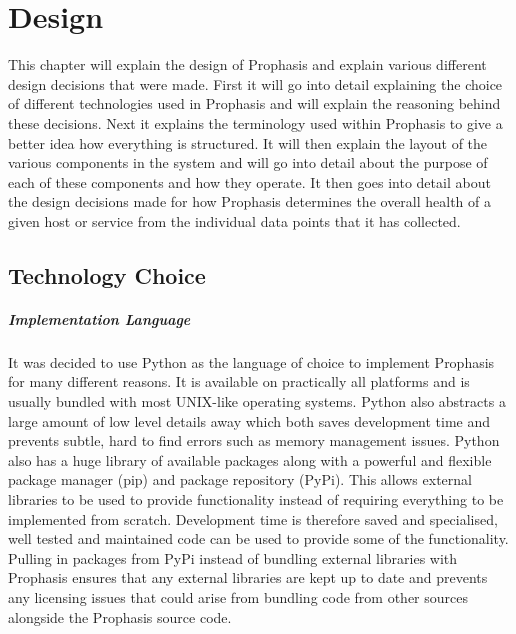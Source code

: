 \documentclass[bsc,deptreport,twoside,parskip,singlespacing,notimes]{infthesis}
\begin{document}

\chapter{Design}
	This chapter will explain the design of Prophasis and explain various different
	design decisions that were made.  First it will go into detail explaining
	the choice of different technologies used in Prophasis and will explain the
	reasoning behind these decisions.  Next it explains the terminology used within
	Prophasis to give a better idea how everything is structured. It will then
	explain the layout of the various components in the system and will go into
	detail about the purpose of each of these components and how they operate.
	It then goes into detail about the design decisions made for how Prophasis
	determines the overall health of a given host or service from the individual
	data points that it has collected.

\section{Technology Choice}
\paragraph*{Implementation Language}
	It was decided to use Python as the language of choice to implement Prophasis
	for many different reasons. It is available on practically all
	platforms and is usually bundled with most UNIX-like operating systems.  Python
	also abstracts a large amount of low level details away which both saves
	development time and prevents subtle, hard to find errors such as memory
	management issues.  Python also has a huge library of available packages along
	with a powerful and flexible package manager (pip) and package repository
	(PyPi).  This allows external libraries to be used to provide functionality
	instead of requiring everything to be implemented from scratch.  Development time
	is therefore saved and specialised, well tested and maintained code
	can be used to provide some of the functionality.  Pulling in packages from
	PyPi instead of bundling external libraries with Prophasis ensures that any
	external libraries are kept up to date and prevents any licensing issues that
	could arise from bundling code from other sources alongside the Prophasis
	source code.
\end{document}
